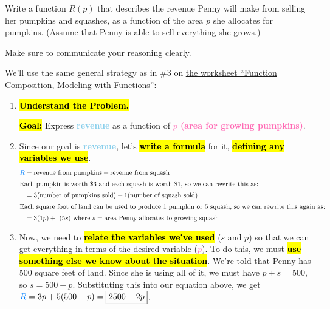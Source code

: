 \documentclass{article}
\makeatletter
\newenvironment{noanswer}{}{}
\let\@href=\href
\renewcommand{\href}[2]{\@href{#1}{\ul{#2}}}
\newcommand{\goal}[1]{\textbf{\textcolor{skyblue}{#1}}}
\newcommand{\indvar}[1]{\textbf{\textcolor{hotpink}{#1}}}
\theoremstyle{theorem}
\makeatother
\begin{document}
\begin{enumerate}
\begin{enumerate}
    \begin{problem}[\newpage]
      Write a function $R(p)$ that describes the revenue Penny will make from selling her pumpkins and squashes, as a function of the area $p$ she allocates for pumpkins. (Assume that Penny is able to sell everything she grows.)

      Make sure to communicate your reasoning clearly. 
    \end{problem}

    \begin{solution}
      We'll use the same general strategy as in {{\#3}} on \href{https://people.math.harvard.edu/~jjchen/mathma/docs/worksheets/worksheet06-sols.html}{the worksheet ``Function Composition, Modeling with Functions''}: 
      \begin{noanswer}
        \begin{enumerate}[label=\arabic*.]
        \item \hl{\textbf{Understand the Problem.}}

          \hl{\textbf{Goal:}} Express \goal{revenue} as a function of \indvar{$p$ (area for growing pumpkins)}.

        \item Since our goal is \goal{revenue}, let's \hl{\textbf{write a formula}} for it, \hl{\textbf{defining any variables we use}}.
          \begin{align*}
            \goal{$R$} &= \text{revenue from pumpkins} + \text{revenue from squash} \\
            \intertext{Each pumpkin is worth \$3 and each squash is worth \$1, so we can rewrite this as:}
            &= 3(\text{number of pumpkins sold}) + 1(\text{number of squash sold}) \\
            \intertext{Each square foot of land can be used to produce 1 pumpkin or 5 squash, so we can rewrite this again as:} &= 3 (1p) + \ (5s) \text{ where $s = \text{area Penny allocates to growing squash}$}
          \end{align*}

        \item Now, we need to \hl{\textbf{relate the variables we've used}} ($s$ and $p$) so that we can get everything in terms of the desired variable (\indvar{$p$}). To do this, we must \hl{\textbf{use something else we know about the situation}}. We're told that Penny has 500 square feet of land. Since she is using all of it, we must have $p + s = 500$, so $s = 500 - p$. Substituting this into our equation above, we get $\goal{$R$} = 3p + 5(500-p) = \boxed{2500-2p}$.
        \end{enumerate}
      \end{noanswer} 
    \end{solution}


\end{enumerate}
\end{enumerate}
\end{document}

